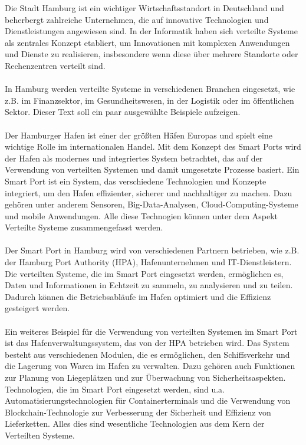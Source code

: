 \documentclass[../vs-script-first-v01.tex]{subfiles}
\begin{document}
Die Stadt Hamburg ist ein wichtiger Wirtschaftsstandort in Deutschland und beherbergt zahlreiche Unternehmen, die auf innovative Technologien und Dienstleistungen angewiesen sind. In der Informatik haben sich verteilte Systeme als zentrales Konzept etabliert, um Innovationen	 mit komplexen Anwendungen und Dienste zu realisieren, insbesondere wenn diese über mehrere Standorte oder Rechenzentren verteilt sind.
\\\\
In Hamburg werden verteilte Systeme in verschiedenen Branchen eingesetzt, wie z.B. im Finanzsektor, im Gesundheitswesen, in der Logistik oder im öffentlichen Sektor. Dieser Text soll ein paar ausgewählte Beispiele aufzeigen.
\\\\
Der Hamburger Hafen ist einer der größten Häfen Europas und spielt eine wichtige Rolle im internationalen Handel. Mit dem Konzept des Smart Ports wird der Hafen als modernes und integriertes System betrachtet, das auf der Verwendung von verteilten Systemen und damit umgesetzte Prozesse basiert.
Ein Smart Port ist ein System, das verschiedene Technologien und Konzepte integriert, um den Hafen effizienter, sicherer und nachhaltiger zu machen. Dazu gehören unter anderem Sensoren, Big-Data-Analysen, Cloud-Computing-Systeme und mobile Anwendungen. Alle diese Technogien können unter dem Aspekt Verteilte Systeme zusammengefasst werden.  
\\\\
Der Smart Port in Hamburg\cite{HPA} wird von verschiedenen Partnern betrieben, wie z.B. der Hamburg Port Authority (HPA), Hafenunternehmen und IT-Dienstleistern. Die verteilten Systeme, die im Smart Port eingesetzt werden, ermöglichen es, Daten und Informationen in Echtzeit zu sammeln, zu analysieren und zu teilen. Dadurch können die Betriebsabläufe im Hafen optimiert und die Effizienz gesteigert werden.
\\\\
Ein weiteres Beispiel für die Verwendung von verteilten Systemen im Smart Port ist das Hafenverwaltungssystem, das von der HPA betrieben wird. Das System besteht aus verschiedenen Modulen, die es ermöglichen, den Schiffsverkehr und die Lagerung von Waren im Hafen zu verwalten. Dazu gehören auch Funktionen zur Planung von Liegeplätzen und zur Überwachung von Sicherheitsaspekten.
Technologien, die im Smart Port eingesetzt werden, sind u.a. Automatisierungstechnologien für Containerterminals und die Verwendung von Blockchain-Technologie zur Verbesserung der Sicherheit und Effizienz von Lieferketten. Alles dies sind wesentliche Technologien aus dem Kern der Verteilten Systeme.
\end{document}
